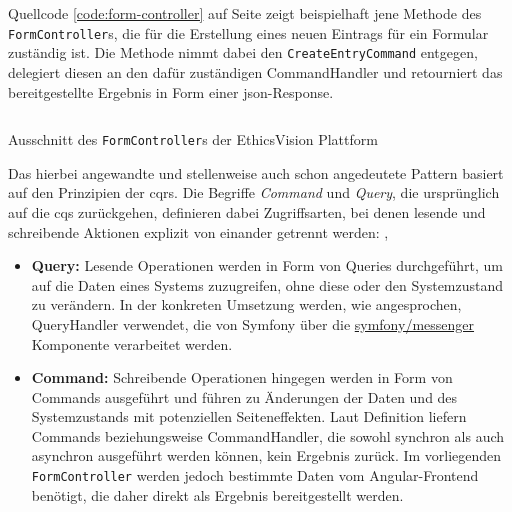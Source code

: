 \documentclass[a4paper,12pt,twoside]{scrreprt}
\begin{document}
\clearpage

Quellcode \ref{code:form-controller} auf Seite \pageref{code:form-controller} zeigt beispielhaft jene Methode des \texttt{FormController}s, die für die Erstellung eines neuen Eintrags für ein Formular zuständig ist. Die Methode nimmt dabei den \texttt{CreateEntryCommand} entgegen, delegiert diesen an den dafür zuständigen CommandHandler und retourniert das bereitgestellte Ergebnis in Form einer \ac{json}-Response.

\begin{listing}[ht]
    \inputminted[fontsize=\footnotesize,linenos,xleftmargin=8mm,breaklines]{php}{code/Luidold_Form-Controller.php}
    \caption{Ausschnitt des \texttt{FormController}s der EthicsVision Plattform}
    \label{code:form-controller}
\end{listing}

Das hierbei angewandte und stellenweise auch schon angedeutete Pattern basiert auf den Prinzipien der \ac{cqrs}. Die Begriffe \textit{Command} und \textit{Query}, die ursprünglich auf die \ac{cqs} zurückgehen, definieren dabei Zugriffsarten, bei denen lesende und schreibende Aktionen explizit von einander getrennt werden: \cite{noauthor_cqrs_2010, fowler_commandqueryseparation_2005}, \cite[238\psq]{ingeno_software_2018}

\begin{itemize}
    \item \textbf{Query:} Lesende Operationen werden in Form von Queries durchgeführt, um auf die Daten eines Systems zuzugreifen, ohne diese oder den Systemzustand zu verändern. In der konkreten Umsetzung werden, wie angesprochen, QueryHandler verwendet, die von Symfony über die \url{symfony/messenger} Komponente verarbeitet werden. \cite{fowler_commandqueryseparation_2005} \cite[238\psq]{ingeno_software_2018}
    \item \textbf{Command:} Schreibende Operationen hingegen werden in Form von Commands ausgeführt und führen zu Änderungen der Daten und des Systemzustands mit potenziellen Seiteneffekten. Laut Definition liefern Commands beziehungsweise CommandHandler, die sowohl synchron als auch asynchron ausgeführt werden können, kein Ergebnis zurück. Im vorliegenden \texttt{FormController} werden jedoch bestimmte Daten vom Angular-Frontend benötigt, die daher direkt als Ergebnis bereitgestellt werden. \cite{fowler_commandqueryseparation_2005} \cite[238\psq]{ingeno_software_2018}
\end{itemize}
\end{document}
